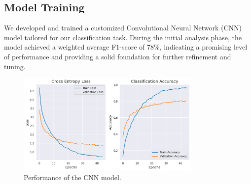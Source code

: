 \newpage

\subsection{Model Training}
We developed and trained a customized Convolutional Neural Network (CNN) model tailored for our classification task. During the initial analysis phase, the model achieved a weighted average F1-score of 78\%, indicating a promising level of performance and providing a solid foundation for further refinement and tuning.

\begin{figure}[h!]
    \centering
    \includegraphics[width=0.8\textwidth]{images/model_training_image.png}
    \caption{Performance of the CNN model.}
    \label{fig:Model evaluation}
\end{figure}

